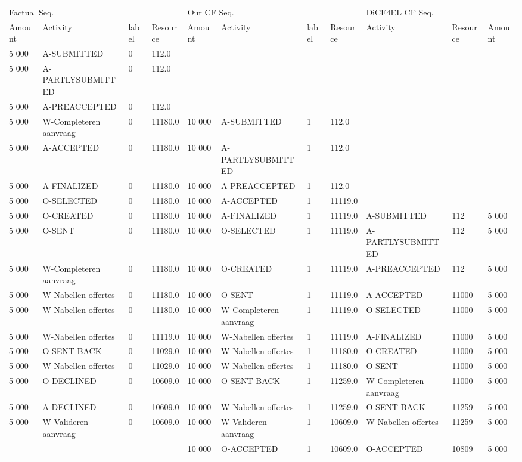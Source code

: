 \begin{tabular}{lllllllllll}
\toprule
\multicolumn{4}{l}{Factual Seq.} & \multicolumn{4}{l}{Our CF Seq.} & \multicolumn{3}{l}{DiCE4EL CF Seq.} \\
Amount & Activity & label & Resource & Amount & Activity & label & Resource & Activity & Resource & Amount \\
\midrule
5 000 & A-SUBMITTED & 0 & 112.0 &  &  &  &  &  &  &  \\
5 000 & A-PARTLYSUBMITTED & 0 & 112.0 &  &  &  &  &  &  &  \\
5 000 & A-PREACCEPTED & 0 & 112.0 &  &  &  &  &  &  &  \\
5 000 & W-Completeren aanvraag & 0 & 11180.0 & 10 000 & A-SUBMITTED & 1 & 112.0 &  &  &  \\
5 000 & A-ACCEPTED & 0 & 11180.0 & 10 000 & A-PARTLYSUBMITTED & 1 & 112.0 &  &  &  \\
5 000 & A-FINALIZED & 0 & 11180.0 & 10 000 & A-PREACCEPTED & 1 & 112.0 &  &  &  \\
5 000 & O-SELECTED & 0 & 11180.0 & 10 000 & A-ACCEPTED & 1 & 11119.0 &  &  &  \\
5 000 & O-CREATED & 0 & 11180.0 & 10 000 & A-FINALIZED & 1 & 11119.0 & A-SUBMITTED & 112 & 5 000 \\
5 000 & O-SENT & 0 & 11180.0 & 10 000 & O-SELECTED & 1 & 11119.0 & A-PARTLYSUBMITTED & 112 & 5 000 \\
5 000 & W-Completeren aanvraag & 0 & 11180.0 & 10 000 & O-CREATED & 1 & 11119.0 & A-PREACCEPTED & 112 & 5 000 \\
5 000 & W-Nabellen offertes & 0 & 11180.0 & 10 000 & O-SENT & 1 & 11119.0 & A-ACCEPTED & 11000 & 5 000 \\
5 000 & W-Nabellen offertes & 0 & 11180.0 & 10 000 & W-Completeren aanvraag & 1 & 11119.0 & O-SELECTED & 11000 & 5 000 \\
5 000 & W-Nabellen offertes & 0 & 11119.0 & 10 000 & W-Nabellen offertes & 1 & 11119.0 & A-FINALIZED & 11000 & 5 000 \\
5 000 & O-SENT-BACK & 0 & 11029.0 & 10 000 & W-Nabellen offertes & 1 & 11180.0 & O-CREATED & 11000 & 5 000 \\
5 000 & W-Nabellen offertes & 0 & 11029.0 & 10 000 & W-Nabellen offertes & 1 & 11180.0 & O-SENT & 11000 & 5 000 \\
5 000 & O-DECLINED & 0 & 10609.0 & 10 000 & O-SENT-BACK & 1 & 11259.0 & W-Completeren aanvraag & 11000 & 5 000 \\
5 000 & A-DECLINED & 0 & 10609.0 & 10 000 & W-Nabellen offertes & 1 & 11259.0 & O-SENT-BACK & 11259 & 5 000 \\
5 000 & W-Valideren aanvraag & 0 & 10609.0 & 10 000 & W-Valideren aanvraag & 1 & 10609.0 & W-Nabellen offertes & 11259 & 5 000 \\
 &  &  &  & 10 000 & O-ACCEPTED & 1 & 10609.0 & O-ACCEPTED & 10809 & 5 000 \\
\bottomrule
\end{tabular}
